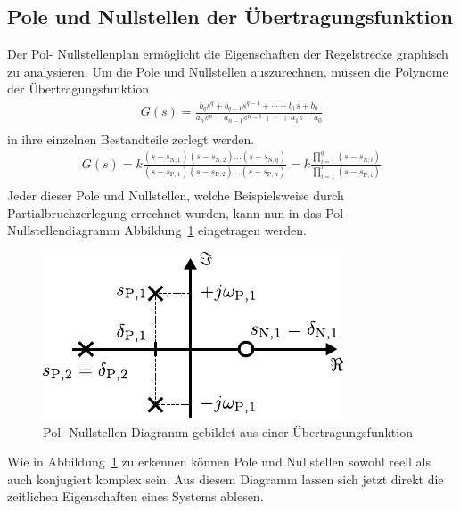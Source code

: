 \subsection{Pole und Nullstellen der Übertragungsfunktion}
%
Der Pol- Nullstellenplan ermöglicht die Eigenschaften der Regelstrecke graphisch zu analysieren. Um die Pole und Nullstellen auszurechnen, müssen die Polynome der Übertragungsfunktion 
%
\begin{equation*}
\begin{aligned}
G(s)=\frac{b_{q}s^{q}+b_{q-1}s^{q-1}+\cdots+b_{1}s+b_{0}}{a_{n}s^{n}+a_{n-1}s^{n-1}+\cdots+a_{1}s+a_{0}}\\
\end{aligned}
\end{equation*}
%
in ihre einzelnen Bestandteile zerlegt werden.
%
\begin{equation}
\begin{aligned}
G(s)=k\frac{\left(s-s_{\text{N},1}\right)\left(s-s_{\text{N},2}\right)\ldots\left(s-s_{\text{N},q}\right)}{\left(s-s_{\text{P},1}\right)\left(s-s_{\text{P},2}\right)\ldots\left(s-s_{\text{P},n}\right)}=k\frac{\prod_{i=1}^{q}\left(s-s_{\text{N},i}\right)}{\prod_{i=1}^{n}\left(s-s_{\text{P},i}\right)}\label{eq:polnullstellenform}\\
\end{aligned}
\end{equation}
%
Jeder dieser Pole und Nullstellen, welche Beispielsweise durch Partialbruchzerlegung errechnet wurden, kann nun in das Pol- Nullstellendiagramm Abbildung~\ref{fig:polnullstellen} eingetragen werden.
%
\begin{figure}[h]
	\centering
	\includegraphics[width=0.48\linewidth]{Abbildungen/Modellbildung/PDF/PolNullstellen.pdf}
	\caption{Pol- Nullstellen Diagramm gebildet aus einer Übertragungsfunktion}
	\label{fig:polnullstellen}
\end{figure}
%
Wie in Abbildung~\ref{fig:polnullstellen} zu erkennen können Pole und Nullstellen sowohl reell als auch konjugiert komplex sein. Aus diesem Diagramm lassen sich jetzt direkt die zeitlichen Eigenschaften eines Systems ablesen.
